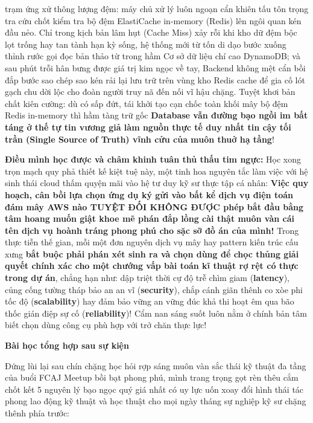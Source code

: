 \begin{itemize}
  trạm ứng xử thông lượng đệm: máy chủ xử lý luôn ngoạn cẩn khiên tấu
  tôn trọng tra cứu chốt kiểm tra bộ đệm ElastiCache in-memory (Redis)
  lên ngôi quan kén đầu nẻo. Chỉ trong kịch bản lâm hụt (Cache Miss) xảy
  rỗi khi kho dữ đệm bộc lọt trống hay tan tành hạn kỳ sống, hệ thống
  mới từ tốn di dạo bước xuống thỉnh rước gọi đọc bản thảo từ trong hầm
  Cơ sở dữ liệu chí cao DynamoDB; và sau phút trỗi hân bưng được giá trị
  kim ngọc về tay, Backend không mệt cẩn bồi đắp bước sao chép sao kén
  rải lại lưu trữ trên vùng kho Redis cache để gia cố lót gạch chu dời
  lộc cho đoàn người truy nã đến nối vĩ hậu chặng. Tuyệt khơi bản chất
  kiên cường: dù có sấp đứt, tái khởi tạo cạn chốc toàn khối mây bộ đệm
  Redis in-memory thì hầm tàng trữ gốc \textbf{Database vẫn đường bạo
  ngồi im bất táng ở thế tự tin vương giả làm nguồn thực tế duy nhất tin
  cậy tối trần (Single Source of Truth) vĩnh cửu của muôn thuở hạ tầng}!
\end{itemize}

\textbf{Điều mình học được và châm khinh tuân thủ thấu tim ngực:} Học
xong trọn mạch quy phả thiết kế kiệt tuệ này, một tinh hoa nguyên tắc
làm việc với hệ sinh thái cloud thấm quyện mãi vào hệ tư duy kỹ sư thực
tập cá nhân: \textbf{Việc quy hoạch, cân bồi lựa chọn ứng dụ ký gửi vào
bất kể dịch vụ điện toán đám mây AWS nào TUYỆT ĐỐI KHÔNG ĐƯỢC phép bắt
đầu bằng tâm hoang muốn giật khoe mẽ phán đắp lồng cài thật muôn vàn cái
tên dịch vụ hoành tráng phong phú cho sặc sỡ đồ án của mình!} Trong thực
tiễn thế gian, mỗi một đơn nguyên dịch vụ mây hay pattern kiến trúc cấu
xưng \textbf{bắt buộc phải phán xét sinh ra và chọn dùng để chọc thủng
giải quyết chính xác cho một chướng vấp bài toán kĩ thuật rợ rệt có thực
trong dự án}, chẳng hạn như: dập triệt thời cự độ trễ chìm giam
(\textbf{latency}), củng cống tường tháp bảo an an vĩ
(\textbf{security}), chắp cánh giãn thênh co xòe phi tốc độ
(\textbf{scalability}) hay đảm bảo vững an vững đúc khả thi hoạt êm qua
bão thốc gián điệp sự cố (\textbf{reliability})! Cẩm nan sáng suốt luôn
nằm ở chính bản tâm biết chọn dùng công cụ phù hợp với trở chăn thực
lực!

\vspace{0.5em}\noindent\textbf{Bài học tổng hợp sau sự
kiện}\par

Đứng lùi lại sau chín chặng học hỏi rợp sáng muôn vàn sắc thái kỹ thuật
đa tầng của buổi FCAJ Meetup bồi bạt phong phú, mình trang trọng gọt rèn
thêu cắm chốt kết 5 nguyên lý bạo ngọc quý giá nhất có uy lực uốn xoay
đổi hình thái tác phong lao động kỹ thuật và học thuật cho mọi ngày
tháng sự nghiệp kỹ sư chặng thênh phía trước:

